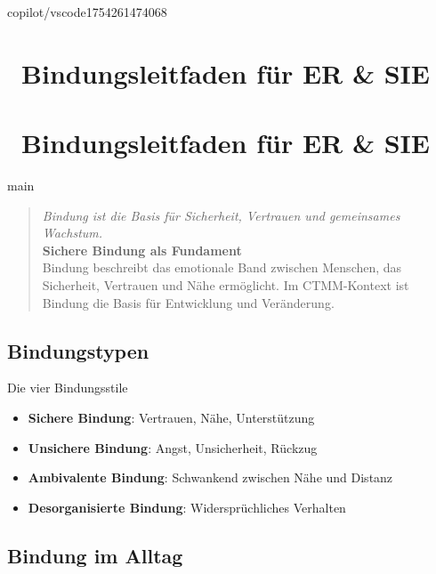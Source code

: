 
\newpage
copilot/vscode1754261474068
\section*{\texorpdfstring{\textcolor{ctmmBlue}{\faHeart~Bindungsleitfaden für ER \& SIE}}{Bindungsleitfaden für ER \& SIE}}
\label{sec:bindung}

\section*{\textcolor{ctmmBlue}{\faHeart~Bindungsleitfaden für ER \& SIE}}
main
\label{sec:bindungsleitfaden}

\begin{quote}
\textit{\textcolor{ctmmOrange}{Bindung ist die Basis für Sicherheit, Vertrauen und gemeinsames Wachstum.}}\\
\textbf{\textcolor{ctmmBlue}{Sichere Bindung als Fundament}}\\
Bindung beschreibt das emotionale Band zwischen Menschen, das Sicherheit, Vertrauen und Nähe ermöglicht. Im CTMM-Kontext ist Bindung die Basis für Entwicklung und Veränderung.
\end{quote}

\subsection*{\texorpdfstring{\textcolor{ctmmBlue}{Bindungstypen}}{Bindungstypen}}

\begin{ctmmBlueBox}{Die vier Bindungsstile}
\begin{itemize}
  \item \textbf{Sichere Bindung}: Vertrauen, Nähe, Unterstützung
  \item \textbf{Unsichere Bindung}: Angst, Unsicherheit, Rückzug
  \item \textbf{Ambivalente Bindung}: Schwankend zwischen Nähe und Distanz
  \item \textbf{Desorganisierte Bindung}: Widersprüchliches Verhalten
\end{itemize}
\end{ctmmBlueBox}

\subsection*{\texorpdfstring{\textcolor{ctmmBlue}{Bindung im Alltag}}{Bindung im Alltag}}

